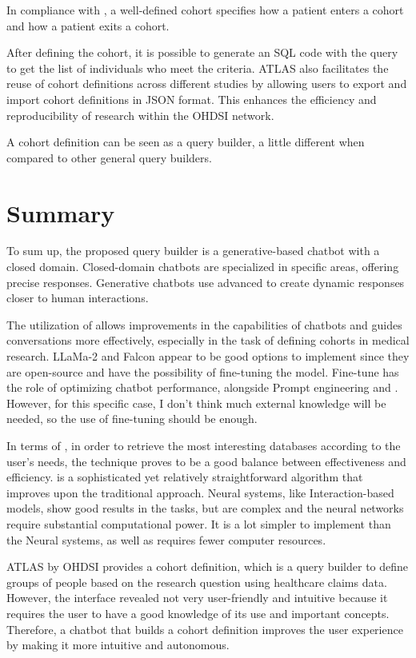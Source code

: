 In compliance with \citet{informatics_chapter_nodate}, a well-defined cohort specifies how a patient enters a cohort and how a patient exits a cohort.

After defining the cohort, it is possible to generate an SQL code with the query to get the list of individuals who meet the criteria. ATLAS also facilitates the reuse of cohort definitions across different studies by allowing users to export and import cohort definitions in JSON format. This enhances the efficiency and reproducibility of research within the OHDSI network.

A cohort definition can be seen as a query builder, a little different when compared to other general query builders.



\section{Summary}

To sum up, the proposed query builder is a generative-based chatbot with a closed domain. Closed-domain chatbots are specialized in specific areas, offering precise responses. Generative chatbots use advanced {\lm} to create dynamic responses closer to human interactions.

The utilization of {\llm} allows improvements in the {\nlg} capabilities of chatbots and guides conversations more effectively, especially in the task of defining cohorts in medical research. LLaMa-2 and Falcon appear to be good options to implement since they are open-source and have the possibility of fine-tuning the model. Fine-tune has the role of optimizing chatbot performance, alongside Prompt engineering and {\rag}. However, for this specific case, I don't think much external knowledge will be needed, so the use of fine-tuning should be enough.

In terms of {\ir}, in order to retrieve the most interesting databases according to the user's needs, the {\bm} technique proves to be a good balance between effectiveness and efficiency. {\bm} is a sophisticated yet relatively straightforward algorithm that improves upon the traditional {\tfidf} approach. Neural {\ir} systems, like Interaction-based models, show good results in the {\ir} tasks, but are complex and the neural networks require substantial computational power. It is a lot simpler to implement than the Neural {\ir} systems, as well as requires fewer computer resources. 

ATLAS by OHDSI provides a cohort definition, which is a query builder to define groups of people based on the research question using healthcare claims data. However, the interface revealed not very user-friendly and intuitive because it requires the user to have a good knowledge of its use and important concepts. Therefore, a chatbot that builds a cohort definition improves the user experience by making it more intuitive and autonomous.


